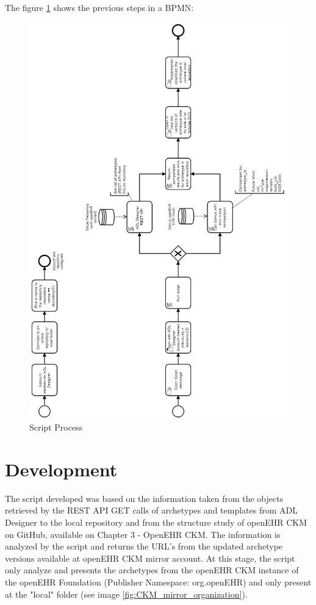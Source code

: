 \documentclass[mim_thesis.tex]{subfiles}
\begin{document}
 The figure \ref{fig:script_process} shows the previous steps in a \ac{BPMN}:
 
\begin{figure}[H]
	\centering
    \includegraphics[width=1.07\textwidth]{img/script_process.PNG}
	\caption{Script Process}
	\label{fig:script_process}
\end{figure}

\section{Development}
The script developed was based on the information taken from the objects retrieved by the REST API GET calls of archetypes and templates from ADL Designer to the local repository and from the structure study of openEHR CKM on GitHub, available on Chapter 3 - OpenEHR CKM. The information is analyzed by the script and returns the URL's from the updated archetype versions available at openEHR CKM mirror account. At this stage, the script only analyze and presents the archetypes from the openEHR CKM instance of the openEHR Foundation (Publisher Namespace: org.openEHR) and only present at the "local" folder (see image \ref{fig:CKM_mirror_organization}).
\end{document}
